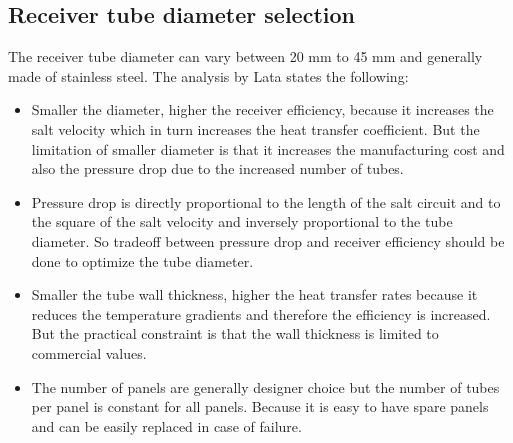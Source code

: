 \subsection{Receiver tube diameter selection}
The receiver tube diameter can vary between 20 mm to 45 mm \cite{Lata.2008} and generally made of stainless steel. The analysis by Lata \cite{Lata.2008} states the following: 
\begin{itemize}
	\item Smaller the diameter, higher the receiver efficiency, because it increases the salt velocity which in turn increases the heat transfer coefficient. But the limitation of smaller diameter is that it increases the manufacturing cost and also the pressure drop due to the increased number of tubes.
	\item Pressure drop is directly proportional to the length of the salt circuit and to the square of the salt velocity and inversely proportional to the tube diameter. So tradeoff between pressure drop and receiver efficiency should be done to optimize the tube diameter.
	\item Smaller the tube wall thickness, higher the heat transfer rates because it reduces the temperature gradients and therefore the efficiency is increased. But the practical constraint is that the wall thickness is limited to commercial values.
	\item The number of panels are generally designer choice but the number of tubes per panel is constant for all panels. Because it is easy to have spare panels and can be easily replaced in case of failure.
\end{itemize}
